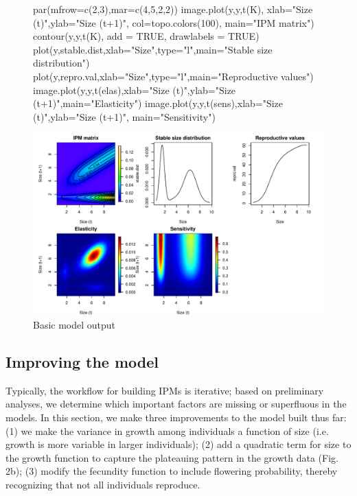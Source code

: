 \documentclass[11pt]{article}
\begin{document}
\begin{figure}[H]
\begin{center}
\begin{Schunk}
\begin{Sinput}
     par(mfrow=c(2,3),mar=c(4,5,2,2)) 
     image.plot(y,y,t(K), xlab="Size (t)",ylab="Size (t+1)",
        col=topo.colors(100), main="IPM matrix")
     contour(y,y,t(K), add = TRUE, drawlabels = TRUE)
     plot(y,stable.dist,xlab="Size",type="l",main="Stable size distribution")
     plot(y,repro.val,xlab="Size",type="l",main="Reproductive values") 
     image.plot(y,y,t(elas),xlab="Size (t)",ylab="Size (t+1)",main="Elasticity")
     image.plot(y,y,t(sens),xlab="Size (t)",ylab="Size (t+1)", main="Sensitivity")
\end{Sinput}
\end{Schunk}
\includegraphics{IPM_Guide_Appendix_A-fig3}
\caption{Basic model output}
\label{fig:figA3}
\end{center}
\end{figure}



\subsection{Improving the model}
Typically, the workflow for building IPMs is iterative; based on preliminary analyses, we determine which important factors are missing or superfluous in the models. In this section, we make three improvements to the model built thus far: (1) we make the variance in growth among individuals a function of size (i.e. growth is more variable in larger individuals); (2) add a quadratic term for size to the growth function to capture the plateauing pattern in the growth data (Fig. 2b); (3) modify the fecundity function to include flowering probability, thereby recognizing that not all individuals reproduce.
\end{document}
